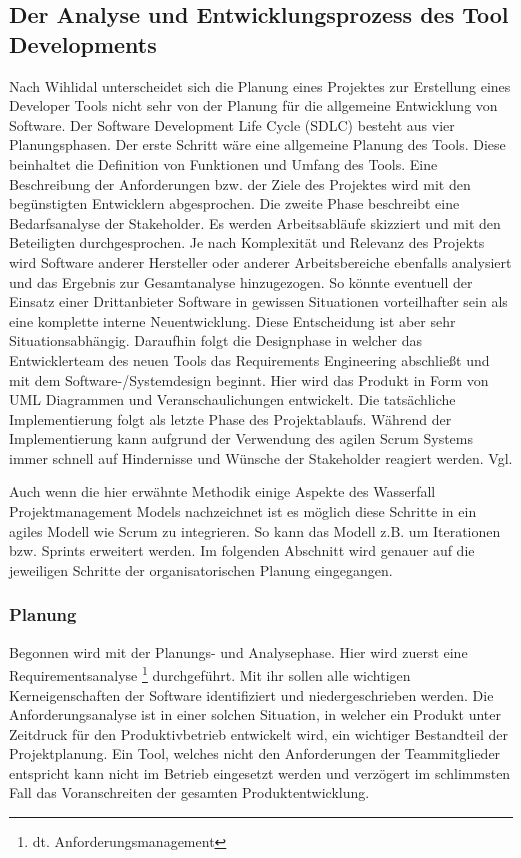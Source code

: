 \documentclass[pagesize, paper=a4, fontsize=12pt, titlepage=true, headings=small, headnosepline, abstractoff, liststotoc, nochapterprefix, plainheadsepline, twoside]{scrreprt}
\begin{document}
\subsection{Der Analyse und Entwicklungsprozess des Tool Developments}
Nach Wihlidal unterscheidet sich die Planung eines Projektes zur Erstellung eines Developer Tools nicht sehr von der Planung für die allgemeine Entwicklung von Software. Der Software Development Life Cycle (SDLC) besteht aus vier Planungsphasen. Der erste Schritt wäre eine allgemeine Planung des Tools. Diese beinhaltet die Definition von Funktionen und Umfang des Tools. Eine Beschreibung der Anforderungen bzw. der Ziele des Projektes wird mit den begünstigten Entwicklern abgesprochen. Die zweite Phase beschreibt eine Bedarfsanalyse der Stakeholder. Es werden Arbeitsabläufe skizziert und mit den Beteiligten durchgesprochen. Je nach Komplexität und Relevanz des Projekts wird Software anderer Hersteller oder anderer Arbeitsbereiche ebenfalls analysiert und das Ergebnis zur Gesamtanalyse hinzugezogen. So könnte eventuell der Einsatz einer Drittanbieter Software in gewissen Situationen vorteilhafter sein als eine komplette interne Neuentwicklung. Diese Entscheidung ist aber sehr Situationsabhängig. Daraufhin folgt die Designphase in welcher das Entwicklerteam des neuen Tools das Requirements Engineering abschließt und mit dem Software-/Systemdesign beginnt. Hier wird das Produkt in Form von UML Diagrammen und Veranschaulichungen entwickelt. Die tatsächliche Implementierung folgt als letzte Phase des Projektablaufs. Während der Implementierung kann aufgrund der Verwendung des agilen Scrum Systems immer schnell auf Hindernisse und Wünsche der Stakeholder reagiert werden. Vgl. \parencite[S. 37-40]{Wihlidal2006}

Auch wenn die hier erwähnte Methodik einige Aspekte des Wasserfall Projektmanagement Models nachzeichnet ist es möglich diese Schritte in ein agiles Modell wie Scrum zu integrieren. So kann das Modell z.B. um Iterationen bzw. Sprints erweitert werden. Im folgenden Abschnitt wird genauer auf die jeweiligen Schritte der organisatorischen Planung eingegangen.

\subsubsection{Planung}
Begonnen wird mit der Planungs- und Analysephase. Hier wird zuerst eine Requirementsanalyse \footnote{dt. Anforderungsmanagement} durchgeführt. Mit ihr sollen alle wichtigen Kerneigenschaften der Software identifiziert und niedergeschrieben werden. Die Anforderungsanalyse ist in einer solchen Situation, in welcher ein Produkt unter Zeitdruck für den Produktivbetrieb entwickelt wird, ein wichtiger Bestandteil der Projektplanung. Ein Tool, welches nicht den Anforderungen der Teammitglieder entspricht kann nicht im Betrieb eingesetzt werden und verzögert im schlimmsten Fall das Voranschreiten der gesamten Produktentwicklung.
\end{document}
